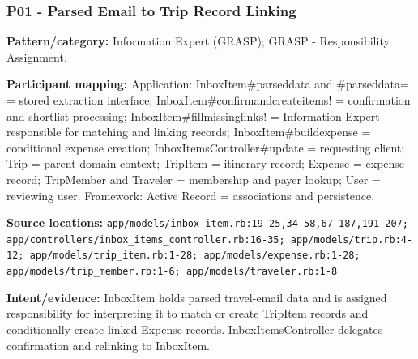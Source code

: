 \documentclass[11pt,a4paper]{article}
\renewcommand{\_}{\textunderscore\allowbreak}
\begin{document}
\subsubsection*{P01 - Parsed Email to Trip Record Linking}
\textbf{Pattern/category:} Information Expert (GRASP); GRASP - Responsibility Assignment.\par
\textbf{Participant mapping:} Application: InboxItem\#parsed\_data and \#parsed\_data= = stored extraction interface; InboxItem\#confirm\_and\_create\_items! = confirmation and shortlist processing; InboxItem\#fill\_missing\_links! = Information Expert responsible for matching and linking records; InboxItem\#build\_expense = conditional expense creation; InboxItemsController\#update = requesting client; Trip = parent domain context; TripItem = itinerary record; Expense = expense record; TripMember and Traveler = membership and payer lookup; User = reviewing user. Framework: Active Record = associations and persistence.\par
\textbf{Source locations:} \nolinkurl{app/models/inbox_item.rb:19-25,34-58,67-187,191-207; app/controllers/inbox_items_controller.rb:16-35; app/models/trip.rb:4-12; app/models/trip_item.rb:1-28; app/models/expense.rb:1-28; app/models/trip_member.rb:1-6; app/models/traveler.rb:1-8}\par
\textbf{Intent/evidence:} InboxItem holds parsed travel-email data and is assigned responsibility for interpreting it to match or create TripItem records and conditionally create linked Expense records. InboxItemsController delegates confirmation and relinking to InboxItem.\par
\end{document}
